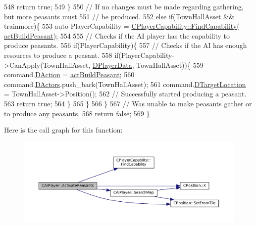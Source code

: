 \begin{DoxyCode}
548         \textcolor{keywordflow}{return} \textcolor{keyword}{true};
549     \}
550     \textcolor{comment}{// If no changes must be made regarding gathering, but more peasants must}
551     \textcolor{comment}{// be produced.}
552     \textcolor{keywordflow}{else} \textcolor{keywordflow}{if}(TownHallAsset && trainmore)\{
553         \textcolor{keyword}{auto} PlayerCapability = \hyperlink{classCPlayerCapability_a881ba4b87385d7cfe5cb6ced2d26f226}{CPlayerCapability::FindCapability}(
      \hyperlink{GameDataTypes_8h_a35b98ce26aca678b03c6f9f76e4778cea66c601dce0fc095460b3c2c25f66ee71}{actBuildPeasant}); 
554         
555         \textcolor{comment}{// Checks if the AI player has the capability to produce peasants.}
556         \textcolor{keywordflow}{if}(PlayerCapability)\{
557             \textcolor{comment}{// Checks if the AI has enough resources to produce a peasant.}
558             \textcolor{keywordflow}{if}(PlayerCapability->CanApply(TownHallAsset, \hyperlink{classCAIPlayer_a83b5113c8f7e80df54940b647c5ee2e6}{DPlayerData}, TownHallAsset))\{
559                 command.\hyperlink{structSPlayerCommandRequest_a80897bbccf2c4e0b148a7aa815a926c6}{DAction} = \hyperlink{GameDataTypes_8h_a35b98ce26aca678b03c6f9f76e4778cea66c601dce0fc095460b3c2c25f66ee71}{actBuildPeasant};
560                 command.\hyperlink{structSPlayerCommandRequest_aa37fc01519676345703d78b9f573894a}{DActors}.push\_back(TownHallAsset);       
561                 command.\hyperlink{structSPlayerCommandRequest_a701702b94ca2fd2738e95ef6711dd41a}{DTargetLocation} = TownHallAsset->Position();
562                 \textcolor{comment}{// Successfully started producing a peasant.}
563                 \textcolor{keywordflow}{return} \textcolor{keyword}{true};
564             \}
565         \}
566     \}
567     \textcolor{comment}{// Was unable to make peasants gather or to produce any peasants.}
568     \textcolor{keywordflow}{return} \textcolor{keyword}{false};
569 \}
\end{DoxyCode}
Here is the call graph for this function\+:\nopagebreak
\begin{figure}[H]
\begin{center}
\leavevmode
\includegraphics[width=350pt]{classCAIPlayer_a3fab1c955fd68bb53fa80bb1872d2819_cgraph}
\end{center}
\end{figure}
